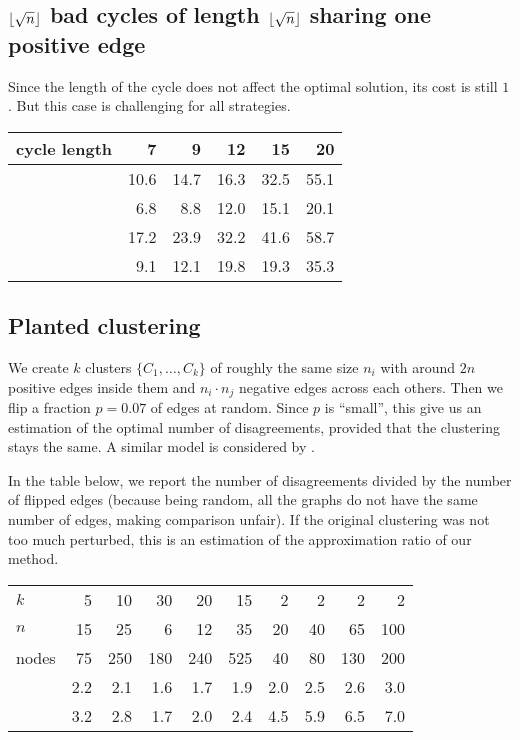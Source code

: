 \subsection{$\floor*{\sqrt{n}}$ bad cycles of length $\floor*{\sqrt{n}}$
	sharing one positive edge}
\label{sub:mixed}

Since the length of the cycle does not affect the optimal solution, its cost
is still $1$. But this case is challenging for all strategies.

\begin{center}
\begin{tabular}{lrrrrr}
\toprule
cycle length & 7    & 9    & 12   & 15   & 20 \\
\midrule
\pot{}       & 10.6 & 14.7 & 16.3 & 32.5 & 55.1 \\
\pat{}       & 6.8  & 8.8  & 12.0 & 15.1 & 20.1 \\
\nnot{}      & 17.2 & 23.9 & 32.2 & 41.6 & 58.7 \\
\nat{}       & 9.1  & 12.1 & 19.8 & 19.3 & 35.3 \\
\bottomrule
\end{tabular}
\end{center}


\subsection{Planted clustering}

We create $k$ clusters $\{C_1, \ldots, C_k\}$ of roughly the same size $n_i$
with around $2n$ positive edges inside them and $n_i\cdot n_j$ negative edges
across each others. Then we flip a fraction $p=0.07$ of edges at random.
Since $p$ is \enquote{small}, this give us an estimation of the optimal number
of disagreements, provided that the clustering stays the same. A similar model
is considered by \textcite{Makarychev2014}.

In the table below, we report the number of disagreements divided by the
number of flipped edges (because being random, all the graphs do not have the
same number of edges, making comparison unfair). If the original clustering
was not too much perturbed, this is an estimation of the approximation ratio
of our method.

\begin{center}
\begin{tabular}{lrrrrrrrrr}
\toprule
$k$      & 5   & 10  & 30  & 20  & 15  & 2   & 2   & 2   & 2  \\
$n$      & 15  & 25  & 6   & 12  & 35  & 20  & 40  & 65  & 100 \\
nodes    & 75  & 250 & 180 & 240 & 525 & 40  & 80  & 130 & 200 \\
\midrule
\pat{}   & 2.2 & 2.1 & 1.6 & 1.7 & 1.9 & 2.0 & 2.5 & 2.6 & 3.0 \\
\pot{}   & 3.2 & 2.8 & 1.7 & 2.0 & 2.4 & 4.5 & 5.9 & 6.5 & 7.0 \\
\bottomrule
\end{tabular}
\end{center}

